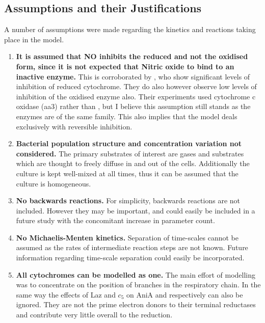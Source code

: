 \subsection{Assumptions and their Justifications}
A number of assumptions were made regarding the kinetics and reactions taking place in the model.
\begin{enumerate}
 \item {\bf It is assumed that NO inhibits the reduced \cbbthree{} and not the oxidised form, since it is not expected that Nitric oxide to bind to an inactive enzyme.} This is corroborated by \citet{Giuffre2000}, who show significant levels of inhibition of reduced cytochrome. They do also however observe low levels of inhibition of the oxidised enzyme also. Their experiments used cytochrome c oxidase (aa3) rather than \cbbthree{}, but I believe this assumption still stands as the enzymes are of the same family. This also implies that the model deals exclusively with reversible inhibition.
 \item {\bf Bacterial population structure and concentration variation not considered.} The primary substrates of interest are gases and substrates which are thought to freely diffuse in and out of the cells. Additionally the culture is kept well-mixed at all times, thus it can be assumed that the culture is homogeneous.
 \item {\bf No backwards reactions.} For simplicity, backwards reactions are not included. However they may be important, and could easily be included in a future study with the concomitant increase in parameter count.
 \item {\bf No Michaelis-Menten kinetics.} Separation of time-scales cannot be assumed as the rates of intermediate reaction steps are not known. Future information regarding time-scale separation could easily be incorporated.
 \item {\bf All cytochromes can be modelled as one.} The main effort of modelling was to concentrate on the position of branches in the respiratory chain. In the same way the effects of Laz and $c_5$ on AniA and \cbbthree{} respectively can also be ignored. They are not the prime electron donors to their terminal reductases and contribute very little overall to the reduction\cite{Deeudom2007}.
\end{enumerate}


